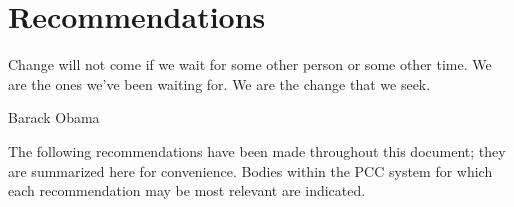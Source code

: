 \chapter{Recommendations}
\epigraph{Change will not come if we wait for some other person or some other
time. We are the ones we've been waiting for. We are the change that we
seek.}{Barack Obama}

The following recommendations have been made throughout this document; they 
are summarized here for convenience. Bodies within the PCC system for which each
recommendation may be most relevant are indicated. 

%
%

